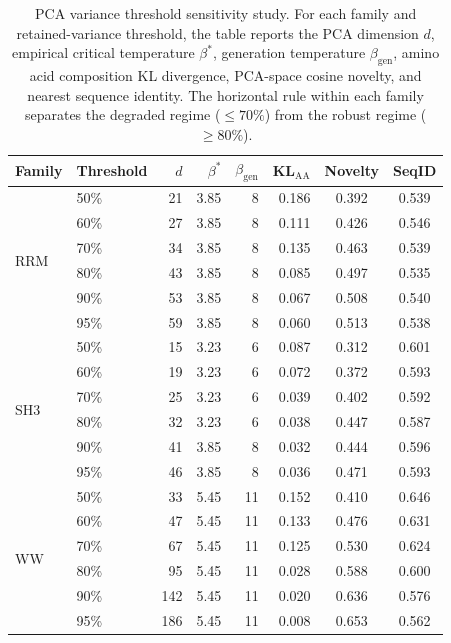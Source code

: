 \documentclass[10pt]{article}
\begin{document}
\begin{table}[p]
\centering
\caption{PCA variance threshold sensitivity study. For each family and retained-variance threshold, the table reports the PCA dimension $d$, empirical critical temperature $\beta^*$, generation temperature $\beta_{\mathrm{gen}}$, amino acid composition KL divergence, PCA-space cosine novelty, and nearest sequence identity. The horizontal rule within each family separates the degraded regime ($\leq 70\%$) from the robust regime ($\geq 80\%$).}
\label{tab:pca-sensitivity}
\scriptsize
\setlength{\tabcolsep}{4pt}
\renewcommand{\arraystretch}{0.85}
\begin{tabular}{@{}llrrrrcc@{}}
\toprule
Family & Threshold & $d$ & $\beta^*$ & $\beta_{\mathrm{gen}}$ & KL$_{\mathrm{AA}}$ & Novelty & SeqID \\
\midrule
\multirow{6}{*}{RRM}
 & 50\% &  21 & 3.85 &  8 & 0.186 & 0.392 & 0.539 \\
 & 60\% &  27 & 3.85 &  8 & 0.111 & 0.426 & 0.546 \\
 & 70\% &  34 & 3.85 &  8 & 0.135 & 0.463 & 0.539 \\
\cmidrule{2-8}
 & 80\% &  43 & 3.85 &  8 & 0.085 & 0.497 & 0.535 \\
 & 90\% &  53 & 3.85 &  8 & 0.067 & 0.508 & 0.540 \\
 & 95\% &  59 & 3.85 &  8 & 0.060 & 0.513 & 0.538 \\
\midrule
\multirow{6}{*}{SH3}
 & 50\% &  15 & 3.23 &  6 & 0.087 & 0.312 & 0.601 \\
 & 60\% &  19 & 3.23 &  6 & 0.072 & 0.372 & 0.593 \\
 & 70\% &  25 & 3.23 &  6 & 0.039 & 0.402 & 0.592 \\
\cmidrule{2-8}
 & 80\% &  32 & 3.23 &  6 & 0.038 & 0.447 & 0.587 \\
 & 90\% &  41 & 3.85 &  8 & 0.032 & 0.444 & 0.596 \\
 & 95\% &  46 & 3.85 &  8 & 0.036 & 0.471 & 0.593 \\
\midrule
\multirow{6}{*}{WW}
 & 50\% &  33 & 5.45 & 11 & 0.152 & 0.410 & 0.646 \\
 & 60\% &  47 & 5.45 & 11 & 0.133 & 0.476 & 0.631 \\
 & 70\% &  67 & 5.45 & 11 & 0.125 & 0.530 & 0.624 \\
\cmidrule{2-8}
 & 80\% &  95 & 5.45 & 11 & 0.028 & 0.588 & 0.600 \\
 & 90\% & 142 & 5.45 & 11 & 0.020 & 0.636 & 0.576 \\
 & 95\% & 186 & 5.45 & 11 & 0.008 & 0.653 & 0.562 \\

\end{tabular}
\end{table}
\end{document}
